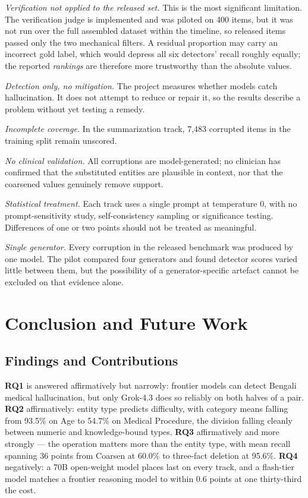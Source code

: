 \documentclass{iutbscthesis}
\begin{document}
\emph{Verification not applied to the released set.} This is the most significant limitation. The verification judge is implemented and was piloted on 400 items, but it was not run over the full assembled dataset within the timeline, so released items passed only the two mechanical filters. A residual proportion may carry an incorrect gold label, which would depress all six detectors' recall roughly equally; the reported \emph{rankings} are therefore more trustworthy than the absolute values.

\emph{Detection only, no mitigation.} The project measures whether models catch hallucination. It does not attempt to reduce or repair it, so the results describe a problem without yet testing a remedy.

\emph{Incomplete coverage.} In the summarization track, 7,483 corrupted items in the training split remain unscored.

\emph{No clinical validation.} All corruptions are model-generated; no clinician has confirmed that the substituted entities are plausible in context, nor that the coarsened values genuinely remove support.

\emph{Statistical treatment.} Each track uses a single prompt at temperature 0, with no prompt-sensitivity study, self-consistency sampling or significance testing. Differences of one or two points should not be treated as meaningful.

\emph{Single generator.} Every corruption in the released benchmark was produced by one model. The pilot compared four generators and found detector scores varied little between them, but the possibility of a generator-specific artefact cannot be excluded on that evidence alone.

\chapter{Conclusion and Future Work} \label{chapter:conclusion}

\section{Findings and Contributions}

\textbf{RQ1} is answered affirmatively but narrowly: frontier models can detect Bengali medical hallucination, but only Grok-4.3 does so reliably on both halves of a pair. \textbf{RQ2} affirmatively: entity type predicts difficulty, with category means falling from 93.5\% on Age to 54.7\% on Medical Procedure, the division falling cleanly between numeric and knowledge-bound types. \textbf{RQ3} affirmatively and more strongly --- the operation matters more than the entity type, with mean recall spanning 36 points from Coarsen at 60.0\% to three-fact deletion at 95.6\%. \textbf{RQ4} negatively: a 70B open-weight model places last on every track, and a flash-tier model matches a frontier reasoning model to within 0.6 points at one thirty-third the cost.
\end{document}
